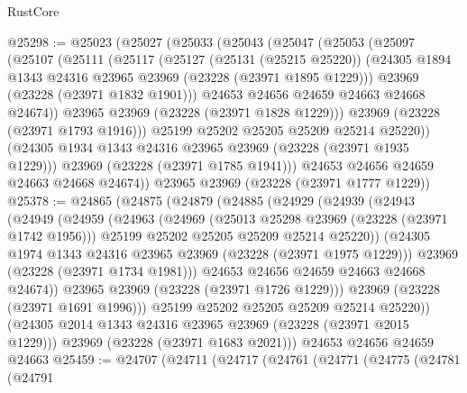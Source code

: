 \begin{lexlean}{RustCore}
\begin{coremodule}
@25298 := @25023
    (@25027
      (@25033
        (@25043
          (@25047
            (@25053
              (@25097
                (@25107
                  (@25111
                    (@25117
                      (@25127
                        (@25131 (@25215 @25220))
                        (@24305 @1894 @1343 @24316 @23965 @23969 (@23228 (@23971 @1895 @1229)))
                        @23969
                        (@23228 (@23971 @1832 @1901)))
                      @24653
                      @24656
                      @24659
                      @24663
                      @24668
                      @24674))
                  @23965
                  @23969
                  (@23228 (@23971 @1828 @1229)))
                @23969
                (@23228 (@23971 @1793 @1916)))
              @25199
              @25202
              @25205
              @25209
              @25214
              @25220))
          (@24305 @1934 @1343 @24316 @23965 @23969 (@23228 (@23971 @1935 @1229)))
          @23969
          (@23228 (@23971 @1785 @1941)))
        @24653
        @24656
        @24659
        @24663
        @24668
        @24674))
    @23965
    @23969
    (@23228 (@23971 @1777 @1229))
@25378 := @24865
    (@24875
      (@24879
        (@24885
          (@24929
            (@24939
              (@24943
                (@24949
                  (@24959
                    (@24963
                      (@24969
                        (@25013 @25298 @23969 (@23228 (@23971 @1742 @1956)))
                        @25199
                        @25202
                        @25205
                        @25209
                        @25214
                        @25220))
                    (@24305 @1974 @1343 @24316 @23965 @23969 (@23228 (@23971 @1975 @1229)))
                    @23969
                    (@23228 (@23971 @1734 @1981)))
                  @24653
                  @24656
                  @24659
                  @24663
                  @24668
                  @24674))
              @23965
              @23969
              (@23228 (@23971 @1726 @1229)))
            @23969
            (@23228 (@23971 @1691 @1996)))
          @25199
          @25202
          @25205
          @25209
          @25214
          @25220))
      (@24305 @2014 @1343 @24316 @23965 @23969 (@23228 (@23971 @2015 @1229)))
      @23969
      (@23228 (@23971 @1683 @2021)))
    @24653
    @24656
    @24659
    @24663
@25459 := @24707
    (@24711
      (@24717
        (@24761
          (@24771
            (@24775
              (@24781
                (@24791

\end{coremodule}
\end{lexlean}
